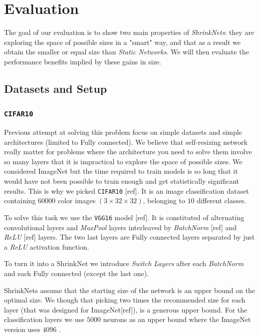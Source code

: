 \section{Evaluation}

The goal of our evaluation is to show two main properties of
\textit{ShrinkNets}: they are exploring the space of possible sizes in a "smart"
way, and that as a result we obtain the smaller or equal size than
\textit{Static Networks}. We will then evaluate the performance benefits implied
by these gains in size.

\subsection{Datasets and Setup}

\subsubsection{\texttt{CIFAR10}}

Previous attempt at solving this problem focus on simple datasets and simple
architectures (limited to Fully connected). We believe that self-resizing
network really matter for problems where the architecture you need to solve them
involve so many layers that it is impractical to explore the space of possible
sizes. We considered ImageNet but the time required to train models is so long
that it would have not been possible to train enough and get statistically
significant results. This is why we picked \texttt{CIFAR10} [ref]. It is an
image classification dataset containing $60000$ color images $(3 \times 32
\times 32)$, belonging to $10$ different classes.

To solve this task we use the \texttt{VGG16} model [ref]. It is constituted of
alternating convolutional layers and \textit{MaxPool} layers interleaved by
\textit{BatchNorm} [ref] and \textit{ReLU} [ref] layers. The two last layers are
Fully connected layers separated by just a \textit{ReLU} activation function.

To turn it into a ShrinkNet we introduce \textit{Switch Layers} after each
\textit{BatchNorm} and each Fully connected (except the last one).

ShrinkNets assume that the starting size of the network is an upper bound on the
optimal size. We though that picking two times the recommended size for each
layer (that was designed for ImageNet[ref]), is a generous upper bound. For the
classification layers we use $5000$ neurons as an upper bound where the ImageNet
version uses $4096$ .


